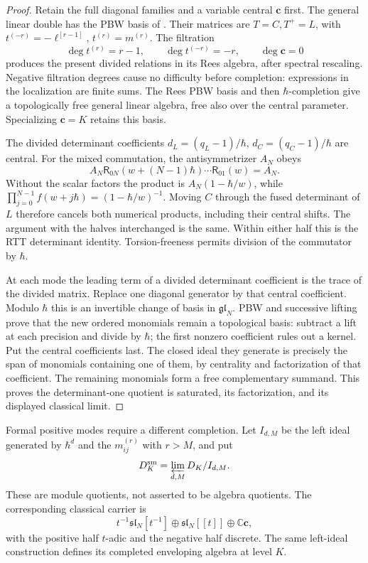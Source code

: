\begin{proof}
Retain the full diagonal families and a variable central
\(\mathbf c\) first. The general linear double has the PBW
basis of \cite[Theorem 2.2, Corollary 2.3, Section 4.1]
{JingKozicMolevYang2017}.
Their matrices are \(T=C,T^+=L\), with
\(t^{(-r)}=-\ell^{[r-1]}\), \(t^{(r)}=m^{(r)}\).
The filtration
\[
 \deg t^{(r)}=r-1,\qquad
 \deg t^{(-r)}=-r,\qquad \deg\mathbf c=0
\]
produces the present divided relations in its Rees algebra,
after spectral rescaling. Negative filtration degrees cause
no difficulty before completion: expressions in the localization
are finite sums. The Rees PBW basis and then \(\hbar\)-completion
give a topologically free general linear algebra, free also
over the central parameter. Specializing \(\mathbf c=K\)
retains this basis.

The divided determinant coefficients
\(d_L=(q_L-1)/\hbar\), \(d_C=(q_C-1)/\hbar\) are central.
For the mixed commutation, the antisymmetrizer \(A_N\) obeys
\[
 A_N\mathsf R_{0N}(w+(N-1)\hbar)\cdots
                   \mathsf R_{01}(w)=A_N.
\]
Without the scalar factors the product is
\(A_N(1-\hbar/w)\), while
\(\prod_{j=0}^{N-1}f(w+j\hbar)=(1-\hbar/w)^{-1}\).
Moving \(C\) through the fused determinant of \(L\) therefore
cancels both numerical products, including their central shifts.
The argument with the halves interchanged is the same.
Within either half this is the RTT determinant identity.
Torsion-freeness permits division of the commutator by \(\hbar\).

At each mode the leading term of a divided determinant coefficient
is the trace of the divided matrix.
Replace one diagonal generator by that central coefficient.
Modulo \(\hbar\) this is an invertible change of basis in
\(\mathfrak{gl}_N\). PBW and successive lifting prove that the
new ordered monomials remain a topological basis: subtract
a lift at each precision and divide by \(\hbar\);
the first nonzero coefficient rules out a kernel.
Put the central coefficients last.
The closed ideal they generate is precisely the span of monomials
containing one of them, by centrality and factorization of that
coefficient. The remaining monomials form a free complementary
summand. This proves the determinant-one quotient is saturated,
its factorization, and its displayed classical limit.
\end{proof}

Formal positive modes require a different completion.
Let \(I_{d,M}\) be the left ideal generated by \(\hbar^d\)
and the \(m_{ij}^{(r)}\) with \(r>M\), and put
\[
 D_K^{\mathrm{sm}}=\varprojlim_{d,M}D_K/I_{d,M}.
\]
These are module quotients, not asserted to be algebra quotients.
The corresponding classical carrier is
\[
 t^{-1}\mathfrak{sl}_N[t^{-1}]
 \oplus\mathfrak{sl}_N[[t]]\oplus\mathbb C\mathbf c,
\]
with the positive half \(t\)-adic and the negative half discrete.
The same left-ideal construction defines its completed enveloping
algebra at level \(K\).


